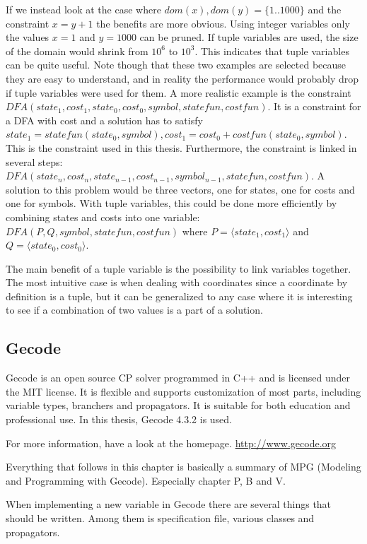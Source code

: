 \documentclass[a4paper,11pt]{article}
\begin{document}
If we instead look at the case where $dom(x),dom(y)=\{1..1000\}$ and the constraint $x=y+1$ the benefits are more obvious. Using integer variables only the values $x=1$ and $y=1000$ can be pruned. If tuple variables are used, the size of the domain would shrink from $10^6$ to $10^3$. This indicates that tuple variables can be quite useful. Note though that these two examples are selected because they are easy to understand, and in reality the performance would probably drop if tuple variables were used for them. A more realistic example is the constraint $DFA(state_1, cost_1, state_0, cost_0, symbol, statefun, costfun)$. It is a constraint for a DFA with cost and a solution has to satisfy $state_1= statefun(state_0, symbol), cost_1=cost_0+costfun(state_0, symbol)$. This is the constraint used in this thesis. Furthermore, the constraint is linked in several steps: $DFA(state_n, cost_n, state_{n-1}, cost_{n-1}, symbol_{n-1}, statefun, costfun)$. A solution to this problem would be three vectors, one for states, one for costs and one for symbols. With tuple variables, this could be done more efficiently by combining states and costs into one variable: $DFA(P, Q, symbol, statefun, costfun)$ where $P=\langle state_1, cost_1\rangle$ and $Q=\langle state_0, cost_0\rangle$.

The main benefit of a tuple variable is the possibility to link variables together. The most intuitive case is when dealing with coordinates since a coordinate by definition is a tuple, but it can be generalized to any case where it is interesting to see if a combination of two values is a part of a solution. 

\subsection{Gecode}
Gecode is an open source CP solver programmed in C++ and is licensed under the MIT license. It is flexible and supports customization of most parts, including variable types, branchers and propagators. It is suitable for both education and professional use. In this thesis, Gecode 4.3.2 is used.

For more information, have a look at the homepage. \url{http://www.gecode.org}

Everything that follows in this chapter is basically a summary of MPG (Modeling and Programming with Gecode). Especially chapter P, B and V.

When implementing a new variable in Gecode there are several things that should be written. Among them is specification file, various classes and propagators.
\end{document}
